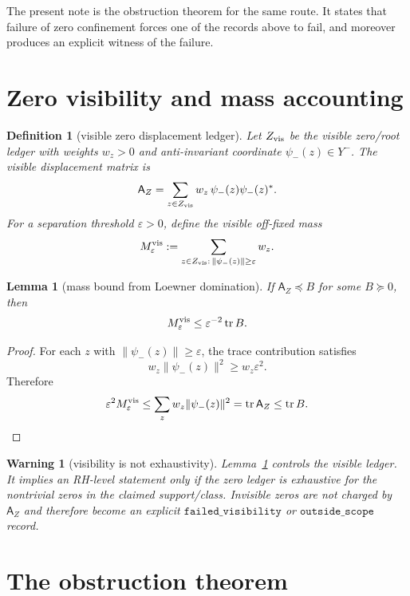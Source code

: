 \documentclass[11pt]{article}
\newtheorem{lemma}{Lemma}
\newtheorem{definition}{Definition}
\newtheorem{warning}{Warning}
\newcommand{\A}{\mathsf A}
\newcommand{\tr}{\operatorname{tr}}
\newcommand{\pre}{\preceq}
\newcommand{\eps}{\varepsilon}
\begin{document}
The present note is the obstruction theorem for the same route.  It states that failure of zero confinement forces one of the records above to fail, and moreover produces an explicit witness of the failure.

\section{Zero visibility and mass accounting}

\begin{definition}[visible zero displacement ledger]
Let $Z_{\rm vis}$ be the visible zero/root ledger with weights $w_z>0$ and anti-invariant coordinate $\psi_-(z)\in Y^-$.  The visible displacement matrix is
\[
\A_Z=\sum_{z\in Z_{\rm vis}} w_z\,\psi_-(z)\psi_-(z)^*.
\]
For a separation threshold $\eps>0$, define the visible off-fixed mass
\[
M_{\eps}^{\rm vis}:=\sum_{z\in Z_{\rm vis}:\,\|\psi_-(z)\|\ge\eps} w_z.
\]
\end{definition}

\begin{lemma}[mass bound from Loewner domination]\label{lem:mass-bound}
If $\A_Z\pre B$ for some $B\succeq0$, then
\[
M_{\eps}^{\rm vis}\le \eps^{-2}\tr B.
\]
\end{lemma}

\begin{proof}
For each $z$ with $\|\psi_-(z)\|\ge\eps$, the trace contribution satisfies
\[
w_z\|\psi_-(z)\|^2\ge w_z\eps^2.
\]
Therefore
\[
\eps^2M_\eps^{\rm vis}\le\sum_z w_z\|\psi_-(z)\|^2=\tr\A_Z\le\tr B.
\]
\end{proof}

\begin{warning}[visibility is not exhaustivity]
Lemma~\ref{lem:mass-bound} controls the visible ledger.  It implies an RH-level statement only if the zero ledger is exhaustive for the nontrivial zeros in the claimed support/class.  Invisible zeros are not charged by $\A_Z$ and therefore become an explicit $\texttt{failed\_visibility}$ or $\texttt{outside\_scope}$ record.
\end{warning}

\section{The obstruction theorem}
\end{document}
